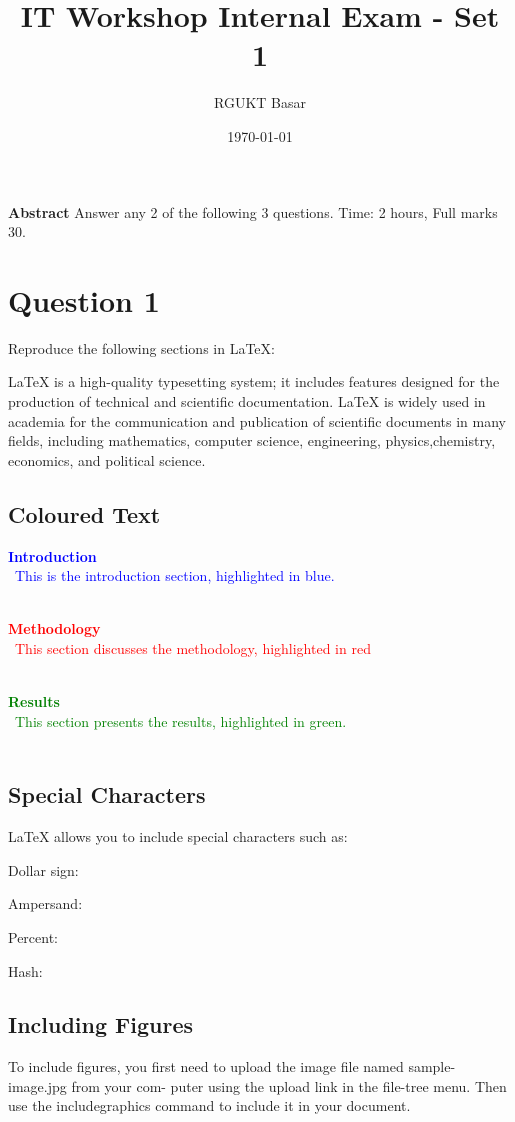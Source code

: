 \documentclass{article}
\title{IT Workshop Internal Exam - Set 1}
\author{RGUKT Basar}
\date{\today}
\begin{document}
	\maketitle
	\textbf{Abstract}
Answer any 2 of the following 3 questions. Time: 2 hours, Full marks 30. 
\section{Question 1}
Reproduce the following sections in LaTeX:

LaTeX is a high-quality typesetting system; it includes features designed for the production of technical and scientific documentation. LaTeX is widely used in academia for the communication and publication of scientific documents in many fields, including mathematics, computer science, engineering, physics,chemistry, economics, and political science.
	
	\subsection{Coloured Text}
	\textbf{\textcolor{blue}{Introduction}}  \\\
	\textcolor{blue}{This is the introduction section, highlighted in blue.}  \\\
	
	\textbf{\textcolor{red}{Methodology}}  \\\
	\textcolor{red}{This section discusses the methodology, highlighted in red}  \\\
	
	\textbf{\textcolor{green}{Results}}  \\\
	\textcolor{green}{This section presents the results, highlighted in green.}  \\\
	
	\subsection{Special Characters}
	\begin{description}
		\item LaTeX allows you to include special characters such as:
		\item Dollar sign: 
		\item Ampersand:
		\item Percent:
		\item Hash:
	\end{description}
	
	\subsection{Including Figures}
	To include figures, you first need to upload the image file named sample-image.jpg from your com-
	puter using the upload link in the file-tree menu. Then use the includegraphics command to include
	it in your document.
	
\end{document}
